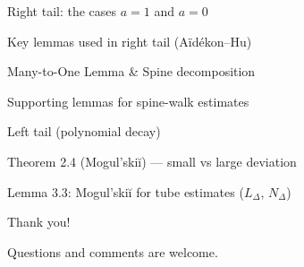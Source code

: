 \documentclass[10pt, aspectratio=169]{beamer}
\begin{document}
\begin{frame}{Right tail: the cases $a=1$ and $a=0$}
    \small
    
\end{frame}

\begin{frame}{Key lemmas used in right tail (A\"id\'ekon--Hu)}
    
\end{frame}

\begin{frame}{Many-to-One Lemma \& Spine decomposition}
    
\end{frame}

\begin{frame}{Supporting lemmas for spine-walk estimates}
    
\end{frame}

\begin{frame}{Left tail (polynomial decay)}
    
\end{frame}

\begin{frame}{Theorem 2.4 (Mogul'ski\u{i}) --- small vs large deviation}
    
\end{frame}

\begin{frame}{Lemma 3.3: Mogul'ski\u{i} for tube estimates ($L_\Delta$, $N_\Delta$)}
    
\end{frame}

\begin{frame}
    \begin{center}
        \Huge \textcolor{blue!80!black}{Thank you!}

        \vspace{1cm}
        \Large Questions and comments are welcome.
    \end{center}
\end{frame}
\end{document}

